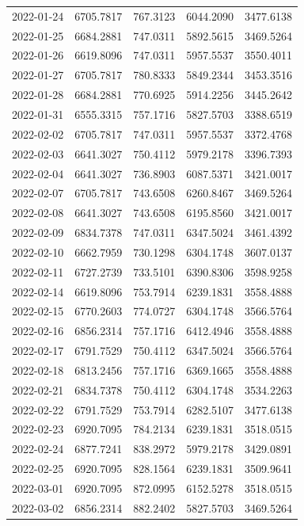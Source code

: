 \begin{footnotesize}
\begin{longtable}{lllll}
2022-01-24 & 6705.7817 & 767.3123 & 6044.2090 & 3477.6138 \\
2022-01-25 & 6684.2881 & 747.0311 & 5892.5615 & 3469.5264 \\
2022-01-26 & 6619.8096 & 747.0311 & 5957.5537 & 3550.4011 \\
2022-01-27 & 6705.7817 & 780.8333 & 5849.2344 & 3453.3516 \\
2022-01-28 & 6684.2881 & 770.6925 & 5914.2256 & 3445.2642 \\
2022-01-31 & 6555.3315 & 757.1716 & 5827.5703 & 3388.6519 \\
2022-02-02 & 6705.7817 & 747.0311 & 5957.5537 & 3372.4768 \\
2022-02-03 & 6641.3027 & 750.4112 & 5979.2178 & 3396.7393 \\
2022-02-04 & 6641.3027 & 736.8903 & 6087.5371 & 3421.0017 \\
2022-02-07 & 6705.7817 & 743.6508 & 6260.8467 & 3469.5264 \\
2022-02-08 & 6641.3027 & 743.6508 & 6195.8560 & 3421.0017 \\
2022-02-09 & 6834.7378 & 747.0311 & 6347.5024 & 3461.4392 \\
2022-02-10 & 6662.7959 & 730.1298 & 6304.1748 & 3607.0137 \\
2022-02-11 & 6727.2739 & 733.5101 & 6390.8306 & 3598.9258 \\
2022-02-14 & 6619.8096 & 753.7914 & 6239.1831 & 3558.4888 \\
2022-02-15 & 6770.2603 & 774.0727 & 6304.1748 & 3566.5764 \\
2022-02-16 & 6856.2314 & 757.1716 & 6412.4946 & 3558.4888 \\
2022-02-17 & 6791.7529 & 750.4112 & 6347.5024 & 3566.5764 \\
2022-02-18 & 6813.2456 & 757.1716 & 6369.1665 & 3558.4888 \\
2022-02-21 & 6834.7378 & 750.4112 & 6304.1748 & 3534.2263 \\
2022-02-22 & 6791.7529 & 753.7914 & 6282.5107 & 3477.6138 \\
2022-02-23 & 6920.7095 & 784.2134 & 6239.1831 & 3518.0515 \\
2022-02-24 & 6877.7241 & 838.2972 & 5979.2178 & 3429.0891 \\
2022-02-25 & 6920.7095 & 828.1564 & 6239.1831 & 3509.9641 \\
2022-03-01 & 6920.7095 & 872.0995 & 6152.5278 & 3518.0515 \\
2022-03-02 & 6856.2314 & 882.2402 & 5827.5703 & 3469.5264 \\

\end{longtable}
\end{footnotesize}
